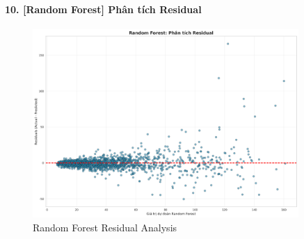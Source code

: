 \documentclass[12pt,a4paper]{article}
\begin{document}
\paragraph{10. [Random Forest] Phân tích Residual}

\begin{figure}[H]
\centering
\includegraphics[width=0.9\textwidth]{results_comb_PM25_Hanoi_2018_sm_20251011_121424/20251011_121424_ml_residual_plot.png}
\caption{Random Forest Residual Analysis}
\end{figure}
\end{document}
